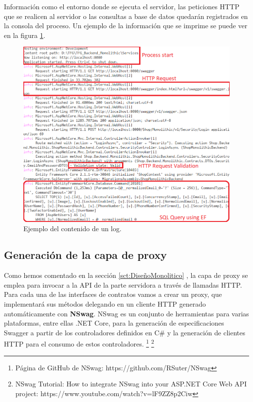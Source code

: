 \documentclass[11pt,spanish,listoffigures]{tfgetsinf}
\begin{document}
Información como el entorno donde se ejecuta el servidor, las peticiones HTTP que se realicen al servidor o las consultas a base de datos quedarán registrados en la consola del proceso. Un ejemplo de la información que se imprime se puede ver en la figura \ref{fig:logging}.

\begin{figure}[h]
\centering
\includegraphics[scale=0.5]{logging}
\caption{Ejemplo del contenido de un log.}
\label{fig:logging}
\end{figure}

\subsection{Generación de la capa de proxy}

Como hemos comentado en la sección \ref{sct:DiseñoMonolitico} , la capa de proxy se emplea para invocar a la API de la parte servidora a través de llamadas HTTP. Para cada una de las interfaces de contratos vamos a crear un proxy, que implementará sus métodos delegando en un cliente HTTP generado automáticamente con \textbf{NSwag}. NSwag es un conjunto de herramientas para varias plataformas, entre ellas .NET Core, para la generación de especificaciones Swagger a partir de los controladores definidos en C\# y la generación de clientes HTTP para el consumo de estos controladores. \footnote{ Página de GitHub de NSwag: https://github.com/RSuter/NSwag} \footnote{ NSwag Tutorial: How to integrate NSwag into your ASP.NET Core Web API project: https://www.youtube.com/watch?v=lF9ZZ8p2Ciw}
\end{document}
